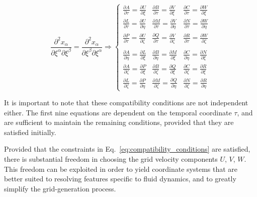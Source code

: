 \documentclass[12pt,letterpaper]{article}
\begin{document}
\begin{equation}
\label{eq:compatibility_conditions}
\frac{\partial^2 x_\alpha}{\partial \xi^\alpha \partial \xi^\beta} =
\frac{\partial^2 x_\alpha}{\partial \xi^\beta \partial \xi^\alpha}\Rightarrow
\left\{
\begin{array}{ccc}
\frac{\partial A}{\partial \tau} = \frac{\partial U}{\partial \xi} &
\frac{\partial B}{\partial \tau} = \frac{\partial V}{\partial \xi} &
\frac{\partial C}{\partial \tau} = \frac{\partial W}{\partial \xi} \\[.5em]
\frac{\partial L}{\partial \tau} = \frac{\partial U}{\partial \eta} &
\frac{\partial M}{\partial \tau} = \frac{\partial V}{\partial \eta} &
\frac{\partial N}{\partial \tau} = \frac{\partial W}{\partial \eta} \\[.5em]
\frac{\partial P}{\partial \tau} = \frac{\partial U}{\partial \zeta} &
\frac{\partial Q}{\partial \tau} = \frac{\partial V}{\partial \zeta} &
\frac{\partial R}{\partial \tau} = \frac{\partial W}{\partial \zeta}
\\[.3em]
 &  & \\[.3em]
\frac{\partial A}{\partial \eta} = \frac{\partial L}{\partial \xi} &
\frac{\partial B}{\partial \eta} = \frac{\partial M}{\partial \xi} &
\frac{\partial C}{\partial \eta} = \frac{\partial N}{\partial \xi} \\[.5em]
\frac{\partial A}{\partial \zeta} = \frac{\partial P}{\partial \xi} &
\frac{\partial B}{\partial \zeta} = \frac{\partial Q}{\partial \xi} &
\frac{\partial C}{\partial \zeta} = \frac{\partial R}{\partial \xi} \\[.5em]
\frac{\partial L}{\partial \zeta} = \frac{\partial P}{\partial \eta} &
\frac{\partial M}{\partial \zeta} = \frac{\partial Q}{\partial \eta} &
\frac{\partial N}{\partial \zeta} = \frac{\partial R}{\partial \eta} 
\end{array}
\right.
\end{equation}

It is important to note that these compatibility conditions are not
independent either. The first nine equations are dependent on the
temporal coordinate $\tau$, and are sufficient to maintain the
remaining conditions, provided that they are satisfied initially.


Provided that the constraints in Eq.~\ref{eq:compatibility_conditions}
are satisfied, there is substantial freedom in choosing the grid
velocity components $U$, $V$, $W$. This freedom can be exploited in
order to yield coordinate systems that are better suited to resolving
features specific to fluid dynamics, and to greatly simplify the
grid-generation process. 
\end{document}

